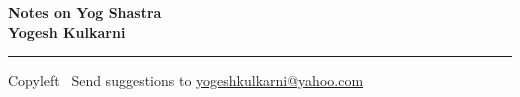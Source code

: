 
\graphicspath{{images/}}

\footnotesize


\begin{center}
\Large{\textbf{Notes on Yog Shastra\\ Yogesh Kulkarni}}  
\end{center}

\begin{multicols}{2}

\end{multicols}

\rule{\linewidth}{0.25pt}
\scriptsize
Copyleft \textcopyleft\  Send suggestions to 
\href{http://www.yogeshkulkarni.com}{yogeshkulkarni@yahoo.com}


